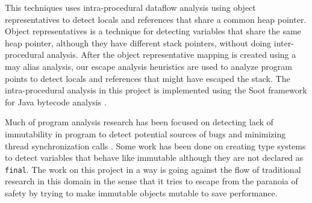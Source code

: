 This techniques uses intra-procedural dataflow analysis using object representatives \citep{ref:or} to detect locals and references that share a common heap pointer. Object representatives is a technique for detecting variables that share the same heap pointer, although they have different stack pointers, without doing inter-procedural analysis. After the object representative mapping is created using a may alias analysis, our escape analysis heuristics are used to analyze program points to detect locals and references that might have escaped the stack. The intra-procedural analysis in this project is implemented using the Soot framework for Java bytecode analysis \citep{ref:Soot}.

Much of program analysis research has been focused on detecting lack of immutability in program to detect potential sources of bugs and minimizing thread synchronization calls \cite{ref:escapejava}\cite{ref:incrementalescape}. Some work has been done on creating type systems to detect variables that behave like immutable although they are not declared as \texttt{final}\cite{ref:finalinference}. The work on this project in a way is going against the flow of traditional research in this domain in the sense that it tries to escape from the paranoia of safety by trying to make immutable objects mutable to save performance.

